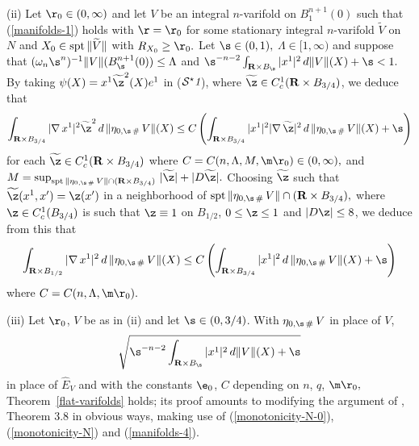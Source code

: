 \documentclass[a4paper,11pt]{amsart}
\begin{document}
 \noindent
(ii) Let $\r_{0} \in (0, \infty)$ and let $V$ be an integral $n$-varifold on $B_{1}^{n+1}(0)$ such that (\ref{manifolds-1}) holds with $\r = \r_{0}$ for some stationary integral $n$-varifold $\widetilde{V}$ on $N$ and $X_{0} \in {\rm spt} \, \|\widetilde{V}\|$ with $R_{X_{0}} \geq  \r_{0}.$ Let $\s \in (0, 1),$ $\Lambda \in [1, \infty)$ and suppose that $(\omega_{n}\s^{n})^{-1}\|V\|(B_{\s}^{n+1}(0)) \leq \Lambda$ and  $\s^{-n-2}\int_{{\mathbf R} \times B_{\s}} |x^{1}|^{2} \, d\|V\|(X) + \s < 1.$ 
By taking $\psi(X) = x^{1}\widetilde{\z}^{2}(X)e^{1}$ in (${\mathcal S^{\star}\emph{1}}$), where $\widetilde{\z} \in C^{1}_{c}({\mathbf R} \times B_{3/4})$, we deduce that 
\begin{equation}\label{manifolds-3}
\int_{{\mathbf R} \times B_{3/4}} |\nabla \, x^{1}|^{2}\widetilde{\z}^{2} \, d \, \|\eta_{0, \s \, \#} \, V\|(X)  \leq C\left(\int_{{\mathbf R} \times B_{3/4}}|x^{1}|^{2}|\nabla \, \widetilde{\z}|^{2} \, d \,\|\eta_{0, \s \, \#} \, V\|(X) + \s\right)
\end{equation}
for each $\widetilde{\z} \in C^{1}_{c}({\mathbf R} \times B_{3/4})$ where $C = C(n, \Lambda, M, \m\r_{0}) \in (0, \infty),$ and $M = \sup_{{\rm spt} \, \|\eta_{0, \s \, \#} \, V\| \cap ({\mathbf R} \times B_{3/4})} \, |\widetilde{\z}| + |D\widetilde{\z}|.$ Choosing $\widetilde{\z}$ such that $\widetilde{\z}(x^{1}, x^{\prime}) = \z(x^{\prime})$ in a neighborhood of ${\rm spt} \, \|\eta_{0, \s \, \#} \, V\| \cap ({\mathbf R} \times B_{3/4}),$ where $\z \in C^{1}_{c}(B_{3/4})$ is such that 
$\z \equiv 1$ on $B_{1/2}$, $0 \leq \z \leq 1$ and $|D\z| \leq 8$, we deduce from this that
\begin{equation}\label{manifolds-4}
\int_{{\mathbf R} \times B_{1/2}} |\nabla \, x^{1}|^{2} \, d \, \|\eta_{0, \s \, \#} \, V\|(X)  \leq C\left(\int_{{\mathbf R} \times B_{3/4}}|x^{1}|^{2}\, d \,\|\eta_{0, \s \, \#} \, V\|(X) + \s\right)
\end{equation}
where $C = C(n, \Lambda, \m\r_{0}).$ 

\noindent
(iii) Let $\r_{0}$, $V$ be as in (ii) and let $\s \in (0, 3/4)$. With $\eta_{0,\s \, \#} \, V$ in place of $V$,  $$\sqrt{\s^{-n-2}\int_{{\mathbf R} \times B_{\s}} |x^{1}|^{2} \, d\|V\|(X) + \s}$$ in place of ${\hat E}_{V}$ and with the constants $\e_{0}$, $C$ depending on $n$, $q$, $\m\r_{0},$ Theorem~\ref{flat-varifolds} holds; its proof amounts to modifying the argument of \cite{A}, Theorem 3.8 in obvious ways, making use of (\ref{monotonicity-N-0}), (\ref{monotonicity-N}) and (\ref{manifolds-4}).
  
\end{document}
